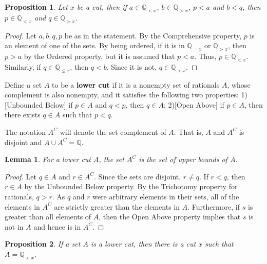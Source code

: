 \documentclass[12pt]{article}
\newtheorem{lemma}{Lemma}[section]
\newtheorem{proposition}{Proposition}[section]
\newcommand{\qcut}[2][x]{\ensuremath{\mathbb{Q}_{#2 #1}}}
\newcommand{\qlt}[1][x]{\qcut[#1]{<}}
\newcommand{\qeq}[1][x]{\qcut[#1]{=}}
\newcommand{\qgt}[1][x]{\qcut[#1]{>}}
\newcommand{\qleq}[1][x]{\qcut[#1]{\leq}}
\begin{document}
\begin{proposition}\label{br:cut-unbounded}
    Let $x$ be a cut, then if $a \in \qlt$, $b \in \qgt$, $p < a$ and $b < q$, then $p \in \qlt$ and $q \in \qgt$.
\end{proposition}

\begin{proof}
    Let $a,b, q, p$ be as in the statement. By the Comprehensive property, $p$ is an element of one of the sets. By being ordered, if it is in $\qeq$ or $\qgt$, then $p > a$ by the Ordered property, but it is assumed that $p < a$. Thus, $p \in \qlt$. Similarly, if $q \in \qleq$, then $q < b$. Since it is not, $q \in \qgt$. 
\end{proof}

Define a set $A$ to be a \textbf{lower cut} if it is a nonempty set of rationals $A$, whose complement is also nonempty, and it satisfies the following two properties: 1) [Unbounded Below] if $p \in A$ and $q < p$, then $q \in A$; 2)[Open Above] if $p \in A$, then there exists $q \in A$ such that $p < q$.

The notation $A^C$ will denote the set complement of $A$. That is, $A$ and $A^C$ is disjoint and $A \cup A^C = \mathbb{Q}$.

\begin{lemma}
    For a lower cut $A$, the set $A^C$ is the set of upper bounds of $A$.
\end{lemma}

\begin{proof}
    Let $q \in A$ and $r \in A^C$. Since the sets are disjoint, $r \neq q$. If $r < q$, then $r \in A$ by the Unbounded Below property. By the Trichotomy property for rationals, $q > r$. As $q$ and $r$ were arbitrary elements in their sets, all of the elements in $A^C$ are strictly greater than the elements in $A$. Furthermore, if $s$ is greater than all elements of $A$, then the Open Above property implies that $s$ is not in $A$ and hence is in $A^C$. 
\end{proof}


\begin{proposition}
    If a set $A$ is a lower cut, then there is a cut $x$ such that $A = \qlt$.
\end{proposition}
\end{document}
